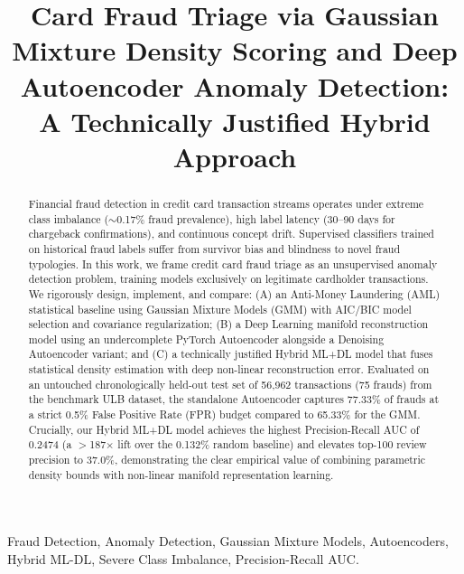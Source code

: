 \documentclass[conference]{IEEEtran}
\begin{document}
\title{Card Fraud Triage via Gaussian Mixture Density Scoring and Deep Autoencoder Anomaly Detection: A Technically Justified Hybrid Approach}

\author{
}

\maketitle

\begin{abstract}
Financial fraud detection in credit card transaction streams operates under extreme class imbalance ($\sim$0.17\% fraud prevalence), high label latency (30--90 days for chargeback confirmations), and continuous concept drift. Supervised classifiers trained on historical fraud labels suffer from survivor bias and blindness to novel fraud typologies. In this work, we frame credit card fraud triage as an unsupervised anomaly detection problem, training models exclusively on legitimate cardholder transactions. We rigorously design, implement, and compare: (A) an Anti-Money Laundering (AML) statistical baseline using Gaussian Mixture Models (GMM) with AIC/BIC model selection and covariance regularization; (B) a Deep Learning manifold reconstruction model using an undercomplete PyTorch Autoencoder alongside a Denoising Autoencoder variant; and (C) a technically justified Hybrid ML+DL model that fuses statistical density estimation with deep non-linear reconstruction error. Evaluated on an untouched chronologically held-out test set of 56,962 transactions (75 frauds) from the benchmark ULB dataset, the standalone Autoencoder captures 77.33\% of frauds at a strict 0.5\% False Positive Rate (FPR) budget compared to 65.33\% for the GMM. Crucially, our Hybrid ML+DL model achieves the highest Precision-Recall AUC of 0.2474 (a $>$187$\times$ lift over the 0.132\% random baseline) and elevates top-100 review precision to 37.0\%, demonstrating the clear empirical value of combining parametric density bounds with non-linear manifold representation learning.
\end{abstract}

\begin{IEEEkeywords}
Fraud Detection, Anomaly Detection, Gaussian Mixture Models, Autoencoders, Hybrid ML-DL, Severe Class Imbalance, Precision-Recall AUC.
\end{IEEEkeywords}
\end{document}
